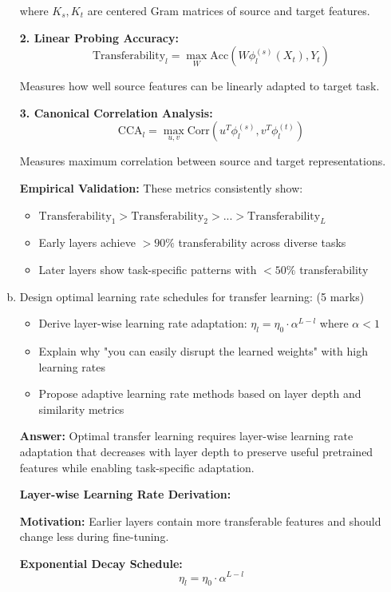 \documentclass[12pt]{article}
\newcommand{\answer}[1]{{\color{answercolor}\textbf{Answer:} #1}}
\newcommand{\explanation}[1]{{\color{explanationcolor}#1}}
\begin{document}
\begin{enumerate}[(a)]
{    where $K_s, K_t$ are centered Gram matrices of source and target features.
    
    \textbf{2. Linear Probing Accuracy:}
    $$\text{Transferability}_l = \max_{W} \text{Acc}(W \phi_l^{(s)}(X_t), Y_t)$$
    
    Measures how well source features can be linearly adapted to target task.
    
    \textbf{3. Canonical Correlation Analysis:}
    $$\text{CCA}_l = \max_{u,v} \text{Corr}(u^T \phi_l^{(s)}, v^T \phi_l^{(t)})$$
    
    Measures maximum correlation between source and target representations.
    
    \textbf{Empirical Validation:}
    These metrics consistently show:
    \begin{itemize}
        \item $\text{Transferability}_1 > \text{Transferability}_2 > ... > \text{Transferability}_L$
        \item Early layers achieve $>90\%$ transferability across diverse tasks
        \item Later layers show task-specific patterns with $<50\%$ transferability
    \end{itemize}
    }
    
    \item Design optimal learning rate schedules for transfer learning: \hfill (5 marks)
    \begin{itemize}
        \item Derive layer-wise learning rate adaptation: $\eta_l = \eta_0 \cdot \alpha^{L-l}$ where $\alpha < 1$
        \item Explain why "you can easily disrupt the learned weights" with high learning rates
        \item Propose adaptive learning rate methods based on layer depth and similarity metrics
    \end{itemize}
    
    \answer{Optimal transfer learning requires layer-wise learning rate adaptation that decreases with layer depth to preserve useful pretrained features while enabling task-specific adaptation.}
    
    \explanation{
    \textbf{Layer-wise Learning Rate Derivation:}
    
    \textbf{Motivation:} Earlier layers contain more transferable features and should change less during fine-tuning.
    
    \textbf{Exponential Decay Schedule:}
    $$\eta_l = \eta_0 \cdot \alpha^{L-l}$$
    
}
\end{enumerate}
\end{document}
